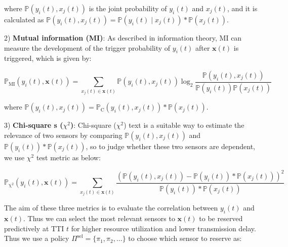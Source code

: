 \documentclass{SCIS2021}
\begin{document}
	\vspace{-6pt}
	\noindent where $\mathbb{P}(y_{i}(t), x_{j}(t))$ is the joint probability of $y_{i}(t)$ and $x_{j}(t)$, and it is calculated as $\mathbb{P}(y_{i}(t), x_{j}(t)) = \mathbb{P}(y_{i}(t) \mid x_{j}(t)) * \mathbb{P}(x_{j}(t))$.

	\par 2) \textbf{Mutual information (MI)}: As described in information theory, MI can measure the development of the trigger probability of $y_{i}(t)$ after $\bm{x}(t)$ is triggered, which is given by:

	\setlength\abovedisplayskip{-15pt}
	\begin{center}
		\begin{equation}
			\mathbb{P}_{\mathrm{MI}}(y_{i}(t), \bm{x}(t))= \sum_{x_{j}(t)\in \bm{x}(t)} \mathbb{P}(y_{i}(t), x_{j}(t)) \log _{2} \frac{\mathbb{P}(y_{i}(t), x_{j}(t))}{\mathbb{P}(y_{i}(t)) \mathbb{P}(x_{j}(t))}
		\end{equation}
	\end{center}
	\setlength\belowdisplayskip{-8pt}

	\vspace{-6pt}
	\noindent where $\mathbb{P}(y_{i}(t), x_{j}(t)) = \mathbb{P}_{\mathrm{C}}(y_{i}(t), x_{j}(t)) * \mathbb{P}(x_{j}(t))$.

	\par 3) \textbf{Chi-square s ($\chi^{2}$)}: Chi-square ($\chi^{2}$) text is a suitable way to estimate the relevance of two sensors by comparing $\mathbb{P}(y_{i}(t), x_{j}(t))$ and $\mathbb{P}(y_{i}(t)) * \mathbb{P}(x_{j}(t))$, so to judge whether these two sensors are dependent, we use $\chi^{2}$ test metric as below:

	\setlength\abovedisplayskip{-16pt}
	\begin{center}
		\begin{equation}
			\mathbb{P}_{\mathrm{\chi^{2}}}(y_{i}(t), \bm{x}(t))= \sum_{x_{j}(t)\in \bm{x}(t)} \frac{(\mathbb{P}(y_{i}(t), x_{j}(t)) - \mathbb{P}(y_{i}(t)) * \mathbb{P}(x_{j}(t)))^{2}}{\mathbb{P}(y_{i}(t)) * \mathbb{P}(x_{j}(t))}
		\end{equation}
	\end{center}
	\setlength\belowdisplayskip{-8pt}


	\vspace{-6pt}
	\par The aim of these three metrics is to evaluate the correlation between $y_{i}(t)$ and $\bm{x}(t)$. Thus we can select the most relevant sensors to $\bm{x}(t)$ to be reserved predictively at TTI $t$ for higher resource utilization and lower transmission delay. Thus we use a policy $\Pi^\text{sel}=\{\pi_{1}, \pi_{2}, \dots\}$ to choose which sensor to reserve as:
\end{document}

